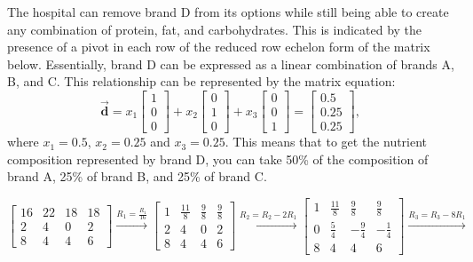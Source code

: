 \documentclass[letter,11pt]{article}
\begin{document}
\begin{tcolorbox}[boxrule=1mm, width=(.9\linewidth),before=\hfill,after=\hfill,adjusted title={Problem \# 4 Solutions}]
The hospital can remove brand D from its options while still being able to create any combination of protein, fat, and carbohydrates. This is indicated by the presence of a pivot in each row of the reduced row echelon form of the matrix below. Essentially, brand D can be expressed as a linear combination of brands A, B, and C. This relationship can be represented by the matrix equation:$$\vec{\boldsymbol{d}} = x_{1} \begin{bmatrix} 1\\ 0\\ 0\end{bmatrix} + x_{2}\begin{bmatrix} 0\\ 1\\ 0\end{bmatrix} + x_{3}\begin{bmatrix} 0\\ 0\\ 1\end{bmatrix} = \begin{bmatrix} 0.5\\ 0.25\\ 0.25\end{bmatrix},$$ 
where $x_{1} = 0.5$, $x_{2} = 0.25$ and $x_{3} = 0.25$. This means that to get the nutrient composition represented by brand D, you can take 50\% of the composition of brand A, 25\% of brand B, and 25\% of brand C.

\tcblower 
$$\begin{bmatrix}
16 & 22 & 18 & 18 \\
2 & 4 & 0 & 2\\
8 & 4 & 4 & 6
\end{bmatrix} \xrightarrow{R_1 = \frac{R_1}{16}}
\begin{bmatrix}
1 & \frac{11}{8} & \frac{9}{8} & \frac{9}{8} \\
2 & 4 & 0 & 2\\
8 & 4 & 4 & 6
\end{bmatrix}\xrightarrow{R_2 = R_2 -2R_1}
\begin{bmatrix}
1 & \frac{11}{8} & \frac{9}{8} & \frac{9}{8} \\
0 & \frac{5}{4} & -\frac{9}{4} & -\frac{1}{4}\\
8 & 4 & 4 & 6
\end{bmatrix}\xrightarrow{R_3 = R_3 -8R_1}$$


\end{tcolorbox}
\end{document}
